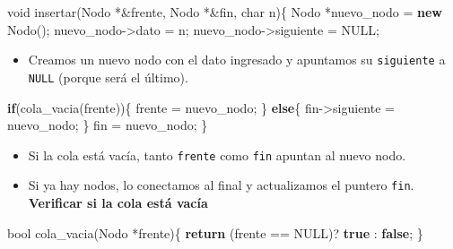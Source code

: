 \documentclass[
  11pt,
  a4paper,
  DIV=11,
  numbers=noendperiod]{scrreprt}
\newenvironment{Shaded}{\begin{snugshade}}{\end{snugshade}}
\newcommand{\ControlFlowTok}[1]{\textcolor[rgb]{0.00,0.23,0.31}{\textbf{#1}}}
\newcommand{\DataTypeTok}[1]{\textcolor[rgb]{0.68,0.00,0.00}{#1}}
\newcommand{\KeywordTok}[1]{\textcolor[rgb]{0.00,0.23,0.31}{\textbf{#1}}}
\newcommand{\NormalTok}[1]{\textcolor[rgb]{0.00,0.23,0.31}{#1}}
\newcommand{\OperatorTok}[1]{\textcolor[rgb]{0.37,0.37,0.37}{#1}}
\providecommand{\tightlist}{%
  \setlength{\itemsep}{0pt}\setlength{\parskip}{0pt}}
\begin{document}
\begin{Shaded}
\begin{Highlighting}[]
\DataTypeTok{void}\NormalTok{ insertar}\OperatorTok{(}\NormalTok{Nodo }\OperatorTok{*\&}\NormalTok{frente}\OperatorTok{,}\NormalTok{ Nodo }\OperatorTok{*\&}\NormalTok{fin}\OperatorTok{,} \DataTypeTok{char}\NormalTok{ n}\OperatorTok{)\{}
\NormalTok{    Nodo }\OperatorTok{*}\NormalTok{nuevo\_nodo }\OperatorTok{=} \KeywordTok{new}\NormalTok{ Nodo}\OperatorTok{();}
\NormalTok{    nuevo\_nodo}\OperatorTok{{-}\textgreater{}}\NormalTok{dato }\OperatorTok{=}\NormalTok{ n}\OperatorTok{;}
\NormalTok{    nuevo\_nodo}\OperatorTok{{-}\textgreater{}}\NormalTok{siguiente }\OperatorTok{=}\NormalTok{ NULL}\OperatorTok{;}
\end{Highlighting}
\end{Shaded}

\begin{itemize}
\tightlist
\item
  Creamos un nuevo nodo con el dato ingresado y apuntamos su
  \texttt{siguiente} a \texttt{NULL} (porque será el último).
\end{itemize}

\begin{Shaded}
\begin{Highlighting}[]
    \ControlFlowTok{if}\OperatorTok{(}\NormalTok{cola\_vacia}\OperatorTok{(}\NormalTok{frente}\OperatorTok{))\{}
\NormalTok{        frente }\OperatorTok{=}\NormalTok{ nuevo\_nodo}\OperatorTok{;}
    \OperatorTok{\}}
    \ControlFlowTok{else}\OperatorTok{\{}
\NormalTok{        fin}\OperatorTok{{-}\textgreater{}}\NormalTok{siguiente }\OperatorTok{=}\NormalTok{ nuevo\_nodo}\OperatorTok{;}
    \OperatorTok{\}}
\NormalTok{    fin }\OperatorTok{=}\NormalTok{ nuevo\_nodo}\OperatorTok{;}
\OperatorTok{\}}
\end{Highlighting}
\end{Shaded}

\begin{itemize}
\tightlist
\item
  Si la cola está vacía, tanto \texttt{frente} como \texttt{fin} apuntan
  al nuevo nodo.
\item
  Si ya hay nodos, lo conectamos al final y actualizamos el puntero
  \texttt{fin}. \textbf{Verificar si la cola está vacía}
\end{itemize}

\begin{Shaded}
\begin{Highlighting}[]
\DataTypeTok{bool}\NormalTok{ cola\_vacia}\OperatorTok{(}\NormalTok{Nodo }\OperatorTok{*}\NormalTok{frente}\OperatorTok{)\{}
    \ControlFlowTok{return} \OperatorTok{(}\NormalTok{frente }\OperatorTok{==}\NormalTok{ NULL}\OperatorTok{)?} \KeywordTok{true} \OperatorTok{:} \KeywordTok{false}\OperatorTok{;}
\OperatorTok{\}}
\end{Highlighting}
\end{Shaded}
\end{document}

